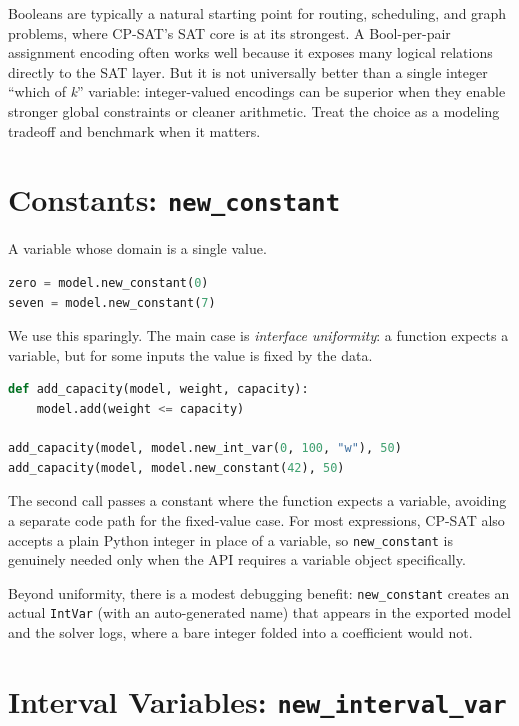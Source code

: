 Booleans are typically a natural starting point for routing, scheduling,
and graph problems, where CP-SAT's SAT core is at its strongest. A
Bool-per-pair assignment encoding often works well because it exposes
many logical relations directly to the SAT layer. But it is not
universally better than a single integer ``which of \emph{k}'' variable:
integer-valued encodings can be superior when they enable stronger
global constraints or cleaner arithmetic. Treat the choice as a modeling
tradeoff and benchmark when it matters.

\section{\texorpdfstring{Constants: \texttt{new\_constant}}{Constants: new\_constant}}\label{sec:6.3}

A variable whose domain is a single value.

\begin{lstlisting}[language=Python]
zero = model.new_constant(0)
seven = model.new_constant(7)
\end{lstlisting}

We use this sparingly. The main case is \emph{interface uniformity}: a
function expects a variable, but for some inputs the value is fixed by
the data.

\begin{lstlisting}[language=Python]
def add_capacity(model, weight, capacity):
    model.add(weight <= capacity)

add_capacity(model, model.new_int_var(0, 100, "w"), 50)
add_capacity(model, model.new_constant(42), 50)
\end{lstlisting}

The second call passes a constant where the function expects a variable,
avoiding a separate code path for the fixed-value case. For most
expressions, CP-SAT also accepts a plain Python integer in place of a
variable, so \lstinline!new_constant! is genuinely needed
only when the API requires a variable object specifically.

Beyond uniformity, there is a modest debugging benefit:
\lstinline!new_constant! creates an actual
\lstinline!IntVar! (with an auto-generated name) that
appears in the exported model and the solver logs, where a bare integer
folded into a coefficient would not.

\section{\texorpdfstring{Interval Variables: \texttt{new\_interval\_var}}{Interval Variables: new\_interval\_var}}\label{sec:6.4}

